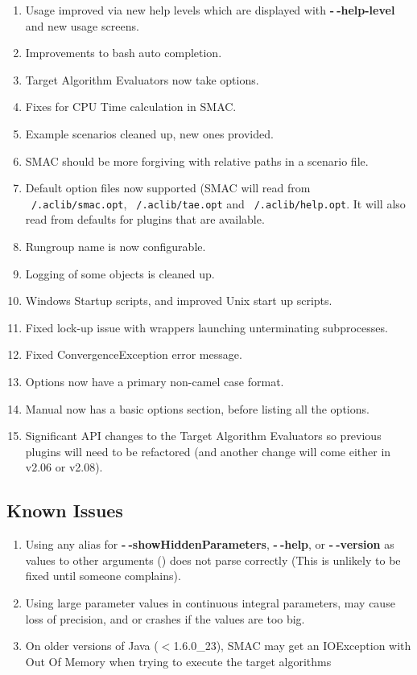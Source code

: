 \documentclass[11pt,letterpaper,oneside]{article}
\begin{document}
\begin{description}
\begin{enumerate}
					 \item Usage improved via new help levels which are displayed with \textbf{-$~\!$-help-level} and new usage screens.
					 \item Improvements to bash auto completion.
					 \item Target Algorithm Evaluators now take options.
					 \item Fixes for CPU Time calculation in SMAC.
					 \item Example scenarios cleaned up, new ones provided.
					 \item SMAC should be more forgiving with relative paths in a scenario file.
					 \item Default option files now supported (SMAC will read from \texttt{~/.aclib/smac.opt}, \texttt{~/.aclib/tae.opt} and \texttt{~/.aclib/help.opt}. It will also read from defaults for plugins that are available.
					 \item Rungroup name is now configurable.
					 \item Logging of some objects is cleaned up.
					 \item Windows Startup scripts, and improved Unix start up scripts.
					 \item Fixed lock-up issue with wrappers launching unterminating subprocesses.
					 \item Fixed ConvergenceException error message.
					 \item Options now have a primary non-camel case format.
					 \item Manual now has a basic options section, before listing all the options.
					 \item Significant API changes to the Target Algorithm Evaluators so previous plugins will need to be refactored (and another change will come either in v2.06 or v2.08).
                  \end{enumerate}


		
	\end{description}
\subsection{Known Issues}

\begin{enumerate}
\item Using any alias for \textbf{-$~\!$-showHiddenParameters}, \textbf{-$~\!$-help}, or \textbf{-$~\!$-version} as values to other arguments () does not parse correctly (This is unlikely to be fixed until someone complains).
\item Using large parameter values in continuous integral parameters, may cause loss of precision, and or crashes if the values are too big.
\item On older versions of Java ($<$1.6.0\_23), SMAC  may get an IOException with Out Of Memory when trying to execute the target algorithms
\end{enumerate}
\end{document}
